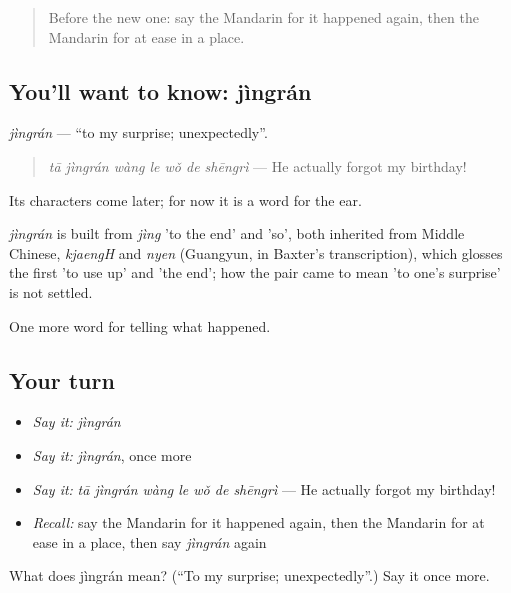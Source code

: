\label{lesson:ZH-C315-jingran}



\begin{quote}
Before the new one: say the Mandarin for it happened again, then the Mandarin for at ease in a place.
\end{quote}

\subsection*{You'll want to know: jìngrán}
\emph{jìngrán} — \textquotedblleft{}to my surprise; unexpectedly\textquotedblright{}.

\begin{quote}
\emph{tā jìngrán wàng le wǒ de shēngrì} — He actually forgot my birthday!
\end{quote}

Its characters come later; for now it is a word for the ear.

\begin{cousinweb}
\emph{jìngrán} is built from \emph{jìng} 'to the end' and  'so', both inherited from Middle Chinese, \emph{kjaengH} and \emph{nyen} (Guangyun, in Baxter's transcription), which glosses the first 'to use up' and 'the end'; how the pair came to mean 'to one's surprise' is not settled.
\end{cousinweb}

\begin{grammarlens}[title={What you've built}]
One more word for telling what happened.
\end{grammarlens}

\subsection*{Your turn}
\begin{itemize}
\raggedright
  \item \emph{Say it:} \emph{jìngrán}
  \item \emph{Say it:} \emph{jìngrán}, once more
  \item \emph{Say it:} \emph{tā jìngrán wàng le wǒ de shēngrì} — He actually forgot my birthday!
  \item \emph{Recall:} say the Mandarin for it happened again, then the Mandarin for at ease in a place, then say \emph{jìngrán} again
\end{itemize}

\begin{tcolorbox}[breakable,colback=teal!4,colframe=teal!35!black,title={Before you move on}]
What does jìngrán mean? (\textquotedblleft{}To my surprise; unexpectedly\textquotedblright{}.) Say it once more.
\end{tcolorbox}
